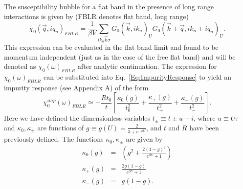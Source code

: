 \documentclass[prl,aps,twocolumn,groupaddress]{revtex4-1}
\begin{document}
The susceptibility bubble for a flat band in the presence of long range interactions is given by (FBLR denotes flat band, long range)
\begin{equation}
\chi_0(\vec q, iq_n)_{FBLR} = \frac{1}{\beta V} \sum_{ik_n \vec k \sigma} G_0(\vec k,ik_n)_U  G_0(\vec k + \vec q,ik_n + i q_n)_U.
\end{equation}
This expression can be evaluated in the flat band limit and found to be momentum independent (just as in the case of the free flat band) and will be denoted as $\chi_0(\omega)_{FBLR}$ after analytic continuation. The expression for $\chi_0(\omega)_{FBLR}$ can be substituted into Eq.~\ref{Eq:ImpurityResponse} to yield an impurity response (see Appendix A) of  the form
\begin{equation}
\chi_0^{imp}(\omega)_{FBLR} \simeq -\frac{R t_0}{t} \left[ \frac{\kappa_0(g)}{t_0^2} + \frac{\kappa_+(g)}{t_+^2} + \frac{\kappa_-(g)}{t_-^2} \right].
\label{eq:ImpurityFBLR}
\end{equation} 
Here we have defined the dimensionless variables $t_{\pm} \equiv t \pm u + i$, where $u\equiv U \tau$ and  $\kappa_0,\kappa_{\pm}$ are functions of $g \equiv g(U) = \frac{2}{3+ e^{-\beta U}}$, and $t$ and $R$ have been previously defined. The functions $\kappa_0,\kappa_{\pm}$ are given by
\begin{eqnarray}
\kappa_0(g) &=& \left(g^2 +\frac{2(1-g)^2}{e^{\beta U} + 1}\right)\\
\kappa_+(g) &=& \frac{2g(1-g)}{e^{\beta U} + 1}\\
\kappa_-(g) &=& g(1-g).
\end{eqnarray}
\end{document}
